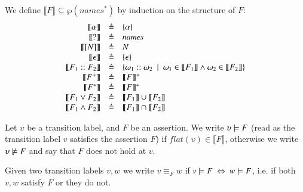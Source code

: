 \begin{definition}
 We define $\llbracket F\rrbracket \subseteq\wp(\mathit{names}^*)$ by induction on the structure of $F$: 
\[
\begin{array}{rcl}
 \llbracket \alpha \rrbracket &\triangleq&  \{\alpha\} \\
 \llbracket ? \rrbracket &\triangleq&   \mathit{names}\\
 \llbracket [N]\rrbracket &\triangleq&   N\\
 \llbracket \epsilon \rrbracket &\triangleq&  \{\epsilon\} \\
 \llbracket F_1::F_2 \rrbracket &\triangleq& \{\omega_1 :: \omega_2~\mid~ \omega_1 \in \llbracket F_1 \rrbracket \wedge \omega_2 \in \llbracket F_2 \rrbracket\}  \\
 \llbracket F^+ \rrbracket &\triangleq& \llbracket F \rrbracket^+  \\
 \llbracket F^* \rrbracket &\triangleq& \llbracket F \rrbracket^*  \\
 \llbracket  F_1 \vee F_2 \rrbracket &\triangleq& \llbracket  F_1\rrbracket \cup \llbracket  F_2\rrbracket  \\
 \llbracket  F_1 \wedge F_2 \rrbracket &\triangleq& \llbracket F_1 \rrbracket \cap \llbracket F_2\rrbracket 
\end{array}
\]
\end{definition}




\begin{definition}\label{sec:semantics}
Let  $\upsilon$ be  a transition label, and $F$ be an assertion.
We write $\upsilon \models F$ (read as the transition label $v$ satisfies the assertion $F$) 
if $\mathit{flat}(\upsilon)\in \llbracket F\rrbracket$, otherwise we write $\upsilon \not\models F$ and say that $F$ does not hold at $v$. 
\end{definition}

Given two transition labels $v,w$ we write $v\equiv_F w$ if $v \models F\ \Leftrightarrow\ w \models F$, i.e. if both $v,w$ satisfy $F$ or they do not.

